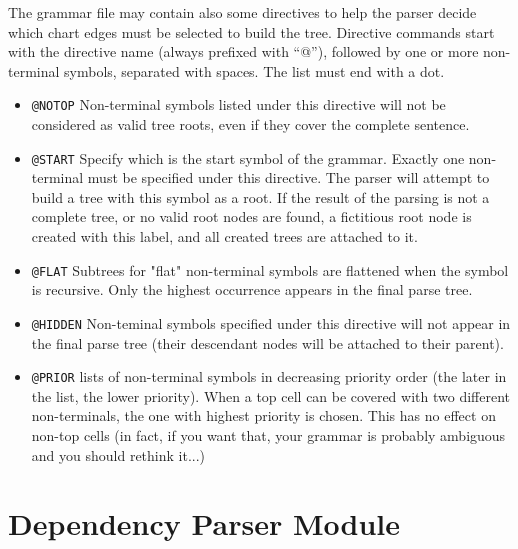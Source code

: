 \documentclass[a4paper]{book}
\begin{document}
   The grammar file may contain also some directives to help
   the parser decide which chart edges must be selected to build the
   tree.
   Directive commands start with the directive name (always prefixed
   with ``@''), followed by one or  more non-terminal symbols,
   separated with spaces. The list must end with a dot.
   \begin{itemize}
     \item {\tt @NOTOP} Non-terminal symbols listed under this
     directive will not be considered as valid tree roots, even if
     they cover the complete sentence.
     \item {\tt @START} Specify which is the start symbol of the
       grammar. Exactly one non-terminal must be specified under this
       directive. 
       The parser will attempt to build a tree with this symbol as a
       root. If the result of the parsing is not a complete tree, or 
       no valid root nodes are found, a fictitious root node is
       created  with this label, and all created trees are attached to it.
     \item {\tt @FLAT} Subtrees for "flat" non-terminal symbols are flattened when
     the symbol is recursive. Only the highest occurrence appears 
     in the final parse tree.
     \item {\tt @HIDDEN} Non-teminal symbols specified under this
     directive will not appear in the final parse tree (their
     descendant nodes will be attached to their parent).
     \item {\tt @PRIOR} lists of non-terminal symbols in decreasing 
     priority order (the later in the list, the lower priority).
     When a top cell can be covered with two different non-terminals,
     the one with highest priority is chosen.  This has no effect
     on non-top cells (in fact, if you want that, your grammar
     is probably ambiguous and you should rethink it...)
   \end{itemize}


\section{Dependency Parser Module}
\end{document}
